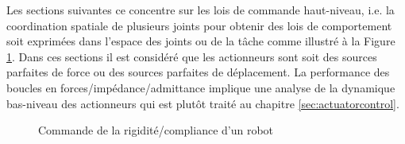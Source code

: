 Les sections suivantes ce concentre sur les lois de commande haut-niveau, i.e. la coordination spatiale de plusieurs joints pour obtenir des lois de comportement soit exprimées dans l'espace des joints ou de la tâche comme illustré à la Figure \ref{fig:stiffnesscontrol}. Dans ces sections il est considéré que les actionneurs sont soit des sources parfaites de force ou des sources parfaites de déplacement. La performance des boucles en forces/impédance/admittance implique une analyse de la dynamique bas-niveau des actionneurs qui est plutôt traité au chapitre \ref{sec:actuatorcontrol}. 


\begin{figure}[H]
        \centering
				\hspace{5pt}
        \caption{Commande de la rigidité/compliance d'un robot}
			\label{fig:stiffnesscontrol}
\end{figure}


